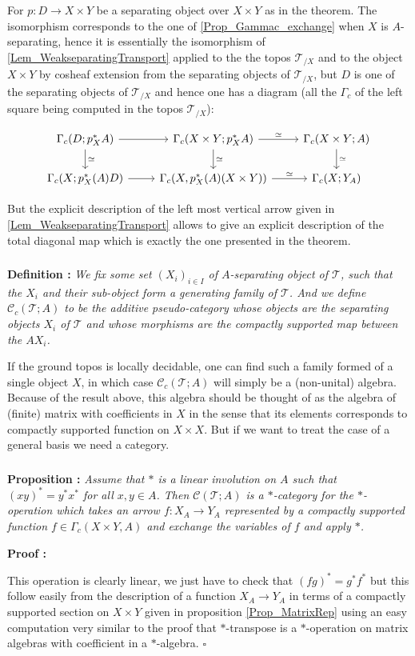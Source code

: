 \documentclass[a4paper]{article}
\newcommand{\Tcal}{\mathcal{T}}
\newcommand{\Ccal}{\mathcal{C}}
\newcommand{\block}[1]
{

\par \subsubsection{} #1

\bigskip}
\newcommand{\Prop}[1]
	{

	\bigskip
	
	\textbf{Proposition : }{\itshape #1}
		
	\bigskip
	
	}
\newcommand{\Def}[1]
	{
	
	\bigskip
	
	\textbf{Definition : }{\itshape #1}
	
	\bigskip
	
	}
\newcommand{\Dem}[1]{
	
	\smallskip
	
	\textbf{Proof : } \par
	 {#1} $\square$
	 
	 \bigskip
}
\begin{document}
{{For $p:D \rightarrow X \times Y $ be a separating object over $X \times Y$ as in the theorem. The isomorphism corresponds to the one of \ref{Prop_Gammac_exchange} when $X$ is $A$-separating, hence it is essentially the isomorphism of \ref{Lem_WeakseparatingTransport} applied to the the topos $\Tcal_{/X}$ and to the object $X \times Y$ by cosheaf extension from the separating objects of $\Tcal_{/X}$, but $D$ is one of the separating objects of $\Tcal_{/X}$ and hence one has a diagram (all the $\Gamma_c$ of the left square being computed in the topos $\Tcal_{/X}$):

\[\begin{tikzcd}[ampersand replacement = \&]
\Gamma_c(D;p_X^* A) \arrow{r} \arrow{d}{\simeq} \& \Gamma_c(X \times Y;p_X^* A) \arrow{d}{\simeq}  \arrow{r}{\simeq} \& \Gamma_c(X \times Y;A) \arrow{d}{\simeq}\\
\Gamma_c(X;p_X^*(A)D) \arrow{r} \& \Gamma_c(X, p_X^*(A)(X \times Y) ) \arrow{r}{\simeq} \& \Gamma_c(X;Y_A)
\end{tikzcd} \]

But the explicit description of the left most vertical arrow given in \ref{Lem_WeakseparatingTransport} allows to give an explicit description of the total diagonal map which is exactly the one presented in the theorem.

}

}



\block{
\Def{ We fix some set $(X_i)_{i \in I}$ of $A$-separating object of $\Tcal$, such that the $X_i$ and their sub-object form a generating family of $\Tcal$. And we define $\Ccal_c(\Tcal;A)$ to be the additive pseudo-category whose objects are the separating objects $X_i$ of $\Tcal$ and whose morphisms are the compactly supported map between the $A X_i$.
}

If the ground topos is locally decidable, one can find such a family formed of a single object $X$, in which case $\Ccal_c(\Tcal;A)$ will simply be a (non-unital) algebra. Because of the result above, this algebra should be thought of as the algebra of (finite) matrix with coefficients in $X$ in the sense that its elements corresponds to compactly supported function on $X \times X$.
But if we want to treat the case of a general basis we need a category.
}


\block{\Prop{Assume that $*$ is a linear involution on $A$ such that $(xy)^*=y^*x^*$ for all $x,y \in A$. Then $\Ccal(\Tcal;A)$ is a $*$-category for the $*$-operation which takes an arrow $f: X_A \rightarrow Y_A$ represented by a compactly supported function $f \in \Gamma_c(X \times Y,A)$ and exchange the variables of $f$ and apply $*$.
}

\Dem{This operation is clearly linear, we just have to check that $(fg)^*=g^* f^*$ but this follow easily from the description of a function $X_A \rightarrow Y_A$ in terms of a compactly supported section on $X \times Y$ given in proposition \ref{Prop_MatrixRep} using an easy computation very similar to the proof that $*$-transpose is a $*$-operation on matrix algebras with coefficient in a $*$-algebra.}

}
\end{document}

